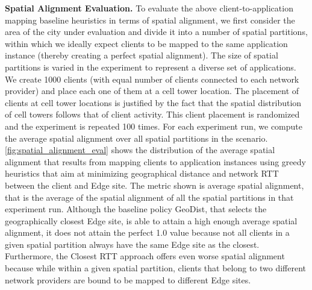 \par \noindent \textbf{Spatial Alignment Evaluation. }To evaluate the above client-to-application mapping baseline heuristics in terms of spatial alignment, we first consider the area of the city under evaluation and divide it into a number of spatial partitions, within which we ideally expect clients to be mapped to the same application instance (thereby creating a perfect spatial alignment). The size of spatial partitions is varied in the experiment to represent a diverse set of applications. We create 1000 clients (with equal number of clients connected to each network provider) and place each one of them at a cell tower location. The placement of clients at cell tower locations is justified by the fact that the spatial distribution of cell towers follows that of client activity. This client placement is randomized and the experiment is repeated 100 times. For each experiment run, we compute the average spatial alignment over all spatial partitions in the scenario. \cref{fig:spatial_alignment_eval} shows the distribution of the average spatial alignment that results from mapping clients to application instances using greedy heuristics that aim at minimizing geographical distance and network RTT between the client and Edge site. The metric shown is average spatial alignment, that is the average of the spatial alignment of all the spatial partitions in that experiment run. Although the baseline policy GeoDist, that selects the geographically closest Edge site, is able to attain a high enough average spatial alignment, it does not attain the perfect 1.0 value because not all clients in a given spatial partition always have the same Edge site as the closest. Furthermore, the Closest RTT approach offers even worse spatial alignment because while within a given spatial partition, clients that belong to two different network providers are bound to be mapped to different Edge sites. 

